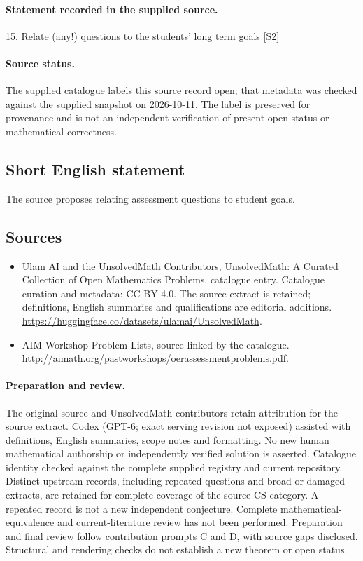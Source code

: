 \documentclass[11pt]{article}
\begin{document}
\paragraph{Statement recorded in the supplied source.}
15. Relate (any!) questions to the students' long term goals \href{http://aimath.org/pastworkshops/oerassessmentproblems.pdf}{[S2]}
\paragraph{Source status.}
The supplied catalogue labels this source record open; that metadata was checked against the supplied snapshot on 2026-10-11. The label is preserved for provenance and is not an independent verification of present open status or mathematical correctness.
\subsection{Short English statement}
The source proposes relating assessment questions to student goals.
\subsection{Sources}
\begin{itemize}
\item[S1] Ulam AI and the UnsolvedMath Contributors, UnsolvedMath: A Curated Collection of Open Mathematics Problems, catalogue entry. Catalogue curation and metadata: CC BY 4.0. The source extract is retained; definitions, English summaries and qualifications are editorial additions.
\url{https://huggingface.co/datasets/ulamai/UnsolvedMath}.
\item[S2] AIM Workshop Problem Lists, source linked by the catalogue.
\url{http://aimath.org/pastworkshops/oerassessmentproblems.pdf}.
\end{itemize}
\paragraph{Preparation and review.}
The original source and UnsolvedMath contributors retain attribution for the source extract. Codex (GPT-6; exact serving revision not exposed) assisted with definitions, English summaries, scope notes and formatting. No new human mathematical authorship or independently verified solution is asserted. Catalogue identity checked against the complete supplied registry and current repository. Distinct upstream records, including repeated questions and broad or damaged extracts, are retained for complete coverage of the source CS category. A repeated record is not a new independent conjecture. Complete mathematical-equivalence and current-literature review has not been performed. Preparation and final review follow contribution prompts C and D, with source gaps disclosed. Structural and rendering checks do not establish a new theorem or open status.
\label{end:statement}
\end{document}
